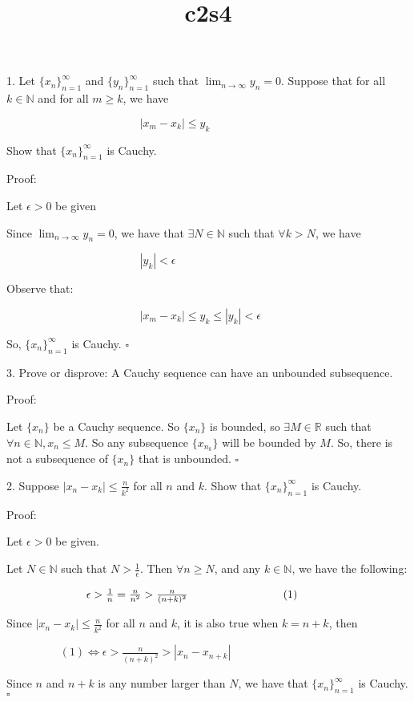 \documentclass{article}
\title{c2s4}
\begin{document}
1.
Let $\{ x_n \}^\infty_{n=1}$ and $\{ y_n\}^\infty_{n=1}$ such that $\lim_{n \rightarrow\infty}y_n = 0$. Suppose that for all $k \in \mathbb{N}$ and for all $m \geq k$, we have

$\hspace{5cm} |x_m - x_k| \le y_k$

Show that $\{ x_n \} ^\infty_{n=1}$ is Cauchy. 

Proof:

Let $\epsilon >0$ be given 

Since $\lim_{n \rightarrow\infty}y_n = 0$, we have that $\exists N \in\mathbb{N}$ such that $\forall k > N$, we have 

$\hspace{5cm}|y_k| < \epsilon$

Observe that:

$\hspace{5cm} |x_m - x_k| \le y_k \le |y_k| <\epsilon$

So, $\{ x_n \}^\infty_{n=1}$ is Cauchy. $\square$


3. Prove or disprove: A Cauchy sequence can have an unbounded subsequence. 

Proof: 

Let $\{x_n\}$ be a Cauchy sequence. So $\{x_n\}$ is bounded, so $\exists M \in \mathbb{R}$ such that $\forall n\in \mathbb{N}, x_n \le M$. So any subsequence $\{ x_{n_k}\}$ will be bounded by $M$. So, there is not a subsequence of $\{x_n\}$ that is unbounded. $\square$


2. Suppose $|x_n-x_k| \le \frac{n}{k^2}$ for all $n$ and $k$. Show that $\{x_n\}^\infty_{n=1}$ is Cauchy. 

Proof: 

Let $\epsilon > 0 $ be given. 

Let $ N \in \mathbb{N}$ such that $ N > \frac{1}{\epsilon}$. Then $\forall n \geq N$, and any $k \in \mathbb{N}$, we have the following: 

$\hspace{2.5cm} \epsilon > \frac{1}{n} = \frac{n}{n^2} > \frac{n}{(n+k)^2}\hspace{3cm} (1)$

Since $|x_n-x_k| \le \frac{n}{k^2}$ for all $n$ and $k$, it is also true when $k = n+k$, then

$\hspace{2cm} (1) \Leftrightarrow \epsilon > \frac{n}{(n+k)^2} > |x_n -x_{n+k}|$

Since $n$ and $n+k$ is any number larger than $N$, we have that $\{x_n\}^\infty_{n=1}$ is Cauchy. $\square$
\end{document}
